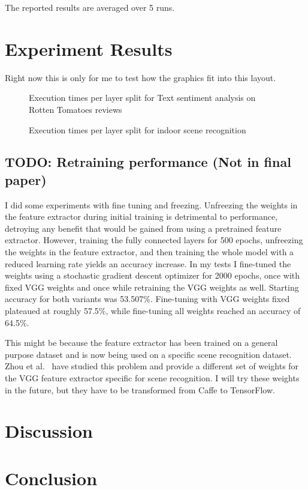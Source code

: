 \documentclass[11pt,twocolumn]{article}
\newcommand{\tf}{TensorFlow}
\begin{document}
The reported results are averaged over 5 runs.

\section{Experiment Results}
\label{sec:results}

Right now this is only for me to test how the graphics fit into this layout.


\begin{figure}[h]
    \centering
	
    \caption{Execution times per layer split for Text sentiment analysis on Rotten Tomatoes reviews}
\end{figure}

\begin{figure*}
	\centering
	
    \caption{Execution times per layer split for indoor scene recognition}
\end{figure*}

\subsection{TODO: Retraining performance (Not in final paper)}

I did some experiments with fine tuning and freezing.
Unfreezing the weights in the feature extractor during initial training is detrimental to performance, detroying any benefit that would be gained from using a pretrained feature extractor.
However, training the fully connected layers for 500 epochs, unfreezing the weights in the feature extractor, and then training the whole model with a reduced learning rate yields an accuracy increase.
In my tests I fine-tuned the weights using a stochastic gradient descent optimizer for 2000 epochs, once with fixed VGG weights and once while retraining the VGG weights as well.
Starting accuracy for both variants was 53.507\%.
Fine-tuning with VGG weights fixed plateaued at roughly 57.5\%, while fine-tuning all weights reached an accuracy of 64.5\%.

This might be because the feature extractor has been trained on a general purpose dataset and is now being used on a specific scene recognition dataset.
Zhou et al.~\cite{zhou_learning_2014} have studied this problem and provide a different set of weights for the VGG feature extractor specific for scene recognition.
I will try these weights in the future, but they have to be transformed from Caffe to \tf{}.

\section{Discussion}
\label{sec:discussion}

\section{Conclusion}
\label{sec:conclusion}



\end{document}
